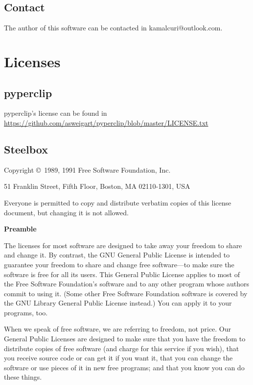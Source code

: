 \documentclass{article}
\begin{document}
  \subsection{Contact}
  The author of this software can be contacted in kamalcuri@outlook.com.

  \section{Licenses}
    \subsection{pyperclip}
    pyperclip's license can be found in \url{https://github.com/asweigart/pyperclip/blob/master/LICENSE.txt}
    \subsection{Steelbox}
    \begin{center}
      {\parindent 0in
      
      Copyright \copyright\ 1989, 1991 Free Software Foundation, Inc.
      
      \bigskip
      
      51 Franklin Street, Fifth Floor, Boston, MA  02110-1301, USA
      
      \bigskip
      
      Everyone is permitted to copy and distribute verbatim copies
      of this license document, but changing it is not allowed.
      }
      \end{center}
      
      \begin{center}
      {\bf\large Preamble}
      \end{center}
      
      
      The licenses for most software are designed to take away your freedom to
      share and change it.  By contrast, the GNU General Public License is
      intended to guarantee your freedom to share and change free software---to
      make sure the software is free for all its users.  This General Public
      License applies to most of the Free Software Foundation's software and to
      any other program whose authors commit to using it.  (Some other Free
      Software Foundation software is covered by the GNU Library General Public
      License instead.)  You can apply it to your programs, too.
      
      When we speak of free software, we are referring to freedom, not price.
      Our General Public Licenses are designed to make sure that you have the
      freedom to distribute copies of free software (and charge for this service
      if you wish), that you receive source code or can get it if you want it,
      that you can change the software or use pieces of it in new free programs;
      and that you know you can do these things.
      
\end{document}
